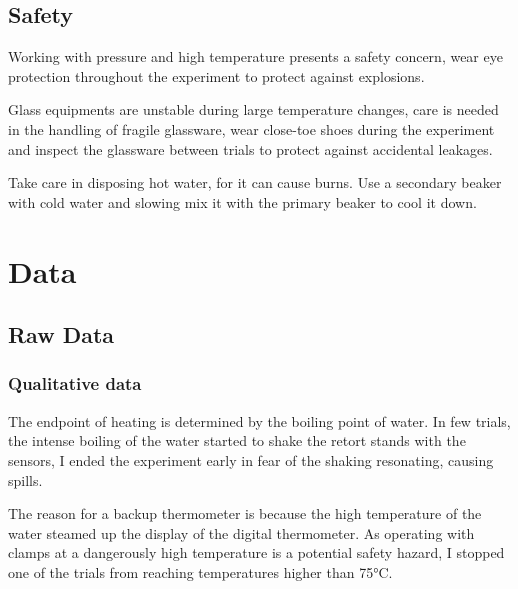 \documentclass[a4paper,12pt]{article}
\begin{document}
\subsection{Safety}
Working with pressure and high temperature presents a safety concern, wear eye protection throughout the experiment to protect against explosions.

Glass equipments are unstable during large temperature changes, care is needed in the handling of fragile glassware, wear close-toe shoes during the experiment and inspect the glassware between trials to protect against accidental leakages.

Take care in disposing hot water, for it can cause burns. Use a secondary beaker with cold water and slowing mix it with the primary beaker to cool it down.

\section{Data}
\subsection{Raw Data}
\subsubsection*{Qualitative data}
The endpoint of heating is determined by the boiling point of water. In few trials, the intense boiling of the water started to shake the retort stands with the sensors, I ended the experiment early in fear of the shaking resonating, causing spills.

The reason for a backup thermometer is because the high temperature of the water steamed up the display of the digital thermometer. As operating with clamps at a dangerously high temperature is a potential safety hazard, I stopped one of the trials from reaching temperatures higher than 75$\si{\celsius}$.
\end{document}
